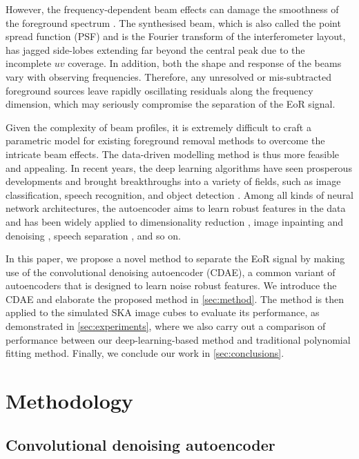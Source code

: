 \documentclass[letters,a4paper,fleqn,usenatbib]{mnras}
\begin{document}
However, the frequency-dependent beam effects can damage the smoothness
of the foreground spectrum \citep{liu2009ps}.
The synthesised beam, which is also called the point spread function (PSF)
and is the Fourier transform of the interferometer layout, has jagged
side-lobes extending far beyond the central peak due to the incomplete
$uv$ coverage.
In addition, both the shape and response of the beams vary with
observing frequencies.
Therefore, any unresolved or mis-subtracted foreground sources leave
rapidly oscillating residuals along the frequency dimension, which may
seriously compromise the separation of the EoR signal.

Given the complexity of beam profiles, it is extremely difficult to
craft a parametric model for existing foreground removal methods to
overcome the intricate beam effects.
The data-driven modelling method is thus more feasible and appealing.
In recent years, the deep learning algorithms have seen prosperous
developments and brought breakthroughs into a variety of fields, such
as image classification, speech recognition, and object detection
\citep{lecun2015}.
Among all kinds of neural network architectures, the autoencoder
aims to learn robust features in the data \citep{vincent2008}
and has been widely applied to
dimensionality reduction \citep{hinton2006},
image inpainting and denoising \citep{suganuma2018},
speech separation \citep{grais2017}, and so on.

In this paper, we propose a novel method to separate the EoR signal by
making use of the convolutional denoising autoencoder (CDAE), a common
variant of autoencoders that is designed to learn noise robust features.
We introduce the CDAE and elaborate the proposed method in
\autoref{sec:method}.
The method is then applied to the simulated SKA image cubes to
evaluate its performance, as demonstrated in \autoref{sec:experiments},
where we also carry out a comparison of performance between our
deep-learning-based method and traditional polynomial fitting method.
Finally, we conclude our work in \autoref{sec:conclusions}.


\section{Methodology}
\label{sec:method}

\subsection{Convolutional denoising autoencoder}
\label{sec:cdae}
\end{document}
